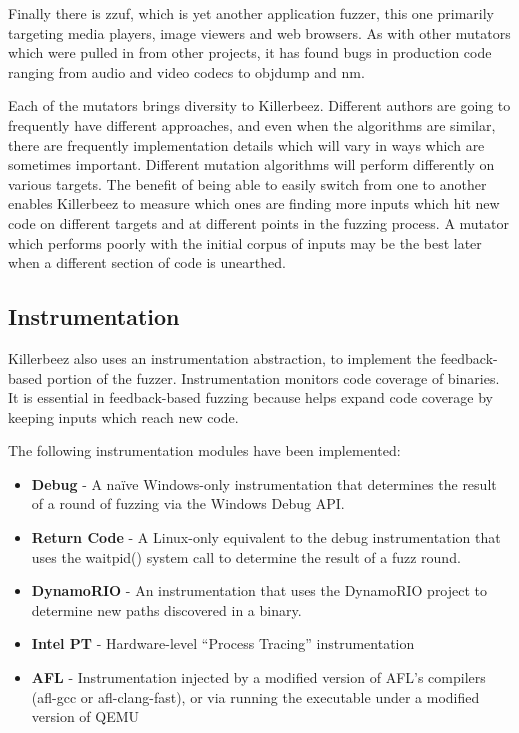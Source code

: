 Finally there is zzuf, which is yet another application fuzzer, this one
primarily targeting media players, image viewers and web browsers.  As with
other mutators which were pulled in from other projects, it has found bugs in
production code ranging from audio and video codecs to objdump and nm.

Each of the mutators brings diversity to Killerbeez.  Different authors are
going to frequently have different approaches, and even when the algorithms
are similar, there are frequently implementation details which will vary in
ways which are sometimes important.  Different mutation algorithms will
perform differently on various targets.  The benefit of being able to easily
switch from one to another enables Killerbeez to measure which ones are finding
more inputs which hit new code on different targets and at different points in
the fuzzing process.  A mutator which performs poorly with the initial corpus
of inputs may be the best later when a different section of code is unearthed.

\subsection{Instrumentation} \label{Instrumentation}
Killerbeez also uses an instrumentation abstraction, to implement the
feedback-based portion of the fuzzer. Instrumentation monitors code coverage of
binaries. It is essential in feedback-based fuzzing because helps expand code
coverage by keeping inputs which reach new code.

The following instrumentation modules have been implemented:
\begin{itemize}[noitemsep]
\item \textbf{Debug} - A na\"ive Windows-only instrumentation that determines the
	result of a round of fuzzing via the Windows Debug API.
\item \textbf{Return Code} - A Linux-only equivalent to the debug instrumentation that
	uses the waitpid() system call to determine the result of a fuzz round.
\item \textbf{DynamoRIO} - An instrumentation that uses the DynamoRIO project to
	determine new paths discovered in a binary.
\item \textbf{Intel PT} - Hardware-level ``Process Tracing'' instrumentation
\item \textbf{AFL} - Instrumentation injected by a modified version of AFL's compilers (afl-gcc or
	afl-clang-fast), or via running the executable under a modified version of QEMU
\end{itemize}

